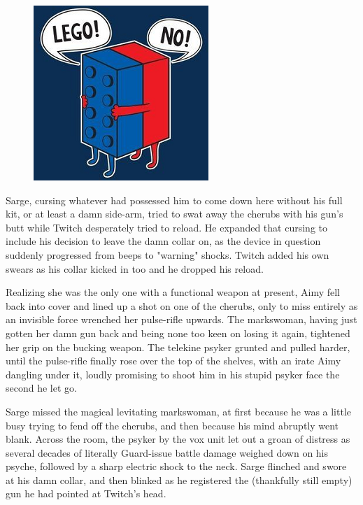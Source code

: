 \begin{figure}
	\begin{center}
		\includegraphics[width=\figwidth]{pics/21/88.png}
	\end{center}
\end{figure}
Sarge, cursing whatever had possessed him to come down here without his full kit, or at least a damn side-arm, tried to swat away the cherubs with his gun's butt while Twitch desperately tried to reload. 
He expanded that cursing to include his decision to leave the damn collar on, as the device in question suddenly progressed from beeps to "warning" shocks. 
Twitch added his own swears as his collar kicked in too and he dropped his reload. 


Realizing she was the only one with a functional weapon at present, Aimy fell back into cover and lined up a shot on one of the cherubs, only to miss entirely as an invisible force wrenched her pulse-rifle upwards. 
The markswoman, having just gotten her damn gun back and being none too keen on losing it again, tightened her grip on the bucking weapon. 
The telekine psyker grunted and pulled harder, until the pulse-rifle finally rose over the top of the shelves, with an irate Aimy dangling under it, loudly promising to shoot him in his stupid psyker face the second he let go. 


Sarge missed the magical levitating markswoman, at first because he was a little busy trying to fend off the cherubs, and then because his mind abruptly went blank. 
Across the room, the psyker by the vox unit let out a groan of distress as several decades of literally Guard-issue battle damage weighed down on his psyche, followed by a sharp electric shock to the neck. 
Sarge flinched and swore at his damn collar, and then blinked as he registered the (thankfully still empty) gun he had pointed at Twitch's head. 


